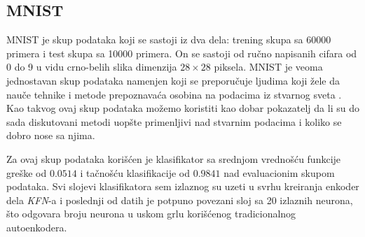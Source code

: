 \documentclass{article}
\begin{document}
	\subsection{MNIST}
	
	MNIST je skup podataka koji se sastoji iz dva dela: trening skupa sa 60000 primera i test skupa sa 10000 primera. 
	On se sastoji od ru\v cno napisanih cifara od 0 do 9 u vidu crno-belih slika dimenzija $28 \times 28$ piksela. 
	MNIST je veoma jednostavan skup podataka namenjen koji se preporu\v cuje ljudima koji \v zele da nau\v ce tehnike i metode prepoznava\'ca osobina na podacima iz stvarnog sveta \cite{lecun-mnisthandwrittendigit-2010}.
	Kao takvog ovaj skup podataka mo\v zemo koristiti kao dobar pokazatelj da li su do sada diskutovani metodi uop\v ste primenljivi nad stvarnim podacima i koliko se dobro nose sa njima.
	
	Za ovaj skup podataka kori\v s\'cen je klasifikator sa srednjom vredno\v s\'cu funkcije gre\v ske od $0.0514$ i ta\v cno\v s\'cu klasifikacije od $0.9841$ nad evaluacionim skupom podataka.
	Svi slojevi klasifikatora sem izlaznog su uzeti u svrhu kreiranja enkoder dela \emph{KFN}-a i poslednji od datih je potpuno povezani sloj sa 20 izlaznih neurona, \v sto odgovara broju neurona u uskom grlu kori\v s\'cenog tradicionalnog autoenkodera.
	
\end{document}
